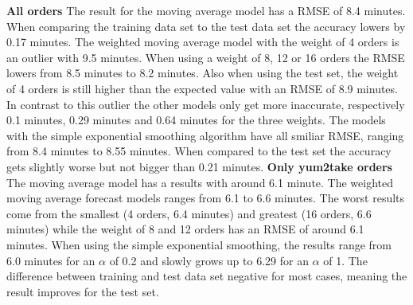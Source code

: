 \newline\newline\textbf{All orders}\newline
The result for the moving average model has a RMSE of 8.4 minutes. When comparing the training data set to the test data set the accuracy lowers by 0.17 minutes. The weighted moving average model with the weight of 4 orders is an outlier with 9.5 minutes. When using a weight of 8, 12 or 16 orders the RMSE lowers from 8.5 minutes to 8.2 minutes. Also when using the test set, the weight of 4 orders is still higher than the expected value with an RMSE of 8.9 minutes. In contrast to this outlier the other models only get more inaccurate, respectively 0.1 minutes, 0.29 minutes and 0.64 minutes for the three weights. The models with the simple exponential smoothing algorithm have all smiliar RMSE, ranging from 8.4 minutes to 8.55 minutes. When compared to the test set the accuracy gets slightly worse but not bigger than 0.21 minutes.
\newline\newline\textbf{Only yum2take orders}\newline
 The moving average model has a results with around 6.1 minute. The weighted moving average forecast models ranges from 6.1 to 6.6 minutes. The worst results come from the smallest (4 orders, 6.4 minutes) and greatest (16 orders, 6.6 minutes) while the weight of 8 and 12 orders has an RMSE of around 6.1 minutes. When using the simple exponential smoothing, the results range from 6.0 minutes for an $\alpha$ of 0.2 and slowly grows up to 6.29 for an $\alpha$ of 1. The difference between training and test data set negative for most cases, meaning the result improves for the test set.
